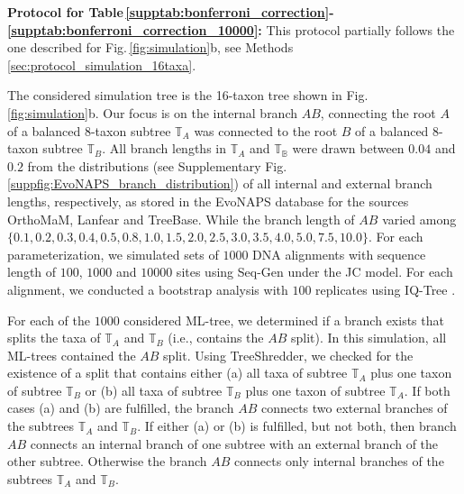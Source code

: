 \begin{appendices}
\noindent\textbf{Protocol for Table\,\ref{supptab:bonferroni_correction}-\,\ref{supptab:bonferroni_correction_10000}:} This protocol partially follows the one described for Fig.\,\ref{fig:simulation}b, see Methods \ref{sec:protocol_simulation_16taxa}.

\medskip

The considered simulation tree is the 16-taxon tree shown in Fig.\,\ref{fig:simulation}b. Our focus is on the internal branch $AB$, connecting the root $A$ of a balanced $8$-taxon subtree $\mathbb{T}_A$ was connected to the root $B$ of a balanced $8$-taxon subtree $\mathbb{T}_B$. All branch lengths in $\mathbb{T}_A$ and $\mathbb{T_B}$ were drawn between $0.04$ and $0.2$ from the distributions (see Supplementary Fig.\,\ref{suppfig:EvoNAPS_branch_distribution}) of all internal and external branch lengths, respectively, as stored in the EvoNAPS database  for the sources OrthoMaM, Lanfear and TreeBase. While the branch length of $AB$ varied among $\{0.1, 0.2, 0.3, 0.4, 0.5, 0.8, 1.0, 1.5, 2.0, 2.5, 3.0, 3.5, 4.0, 5.0, 7.5, 10.0\}$. For each parameterization, we simulated sets of $1000$ DNA alignments with sequence length of $100$, $1000$ and $10000$ sites using Seq-Gen  under the JC model. For each alignment, we conducted a bootstrap analysis with $100$ replicates using IQ-Tree . 

For each of the $1000$ considered ML-tree, we determined if a branch exists that splits the taxa of $\mathbb{T}_A$ and $\mathbb{T}_B$ (i.e.,  contains the $AB$ split). In this simulation, all ML-trees contained the $AB$ split. {\color{olive}Using  TreeShredder}, we checked for the existence of a split that contains either (a) all taxa of subtree $\mathbb{T}_A$ plus one taxon of subtree $\mathbb{T}_B$ or (b) all taxa of subtree $\mathbb{T}_B$ plus one taxon of subtree $\mathbb{T}_A$. If both cases (a) and (b) are fulfilled, the branch $AB$ connects two external branches of the subtrees $\mathbb{T}_A$ and $\mathbb{T}_B$. If  either (a) or (b) is fulfilled, but not both, then  branch $AB$ connects an internal branch of one subtree with an external branch of the other subtree. Otherwise the branch $AB$ connects only internal branches of the subtrees $\mathbb{T}_A$ and $\mathbb{T}_B$.
\clearpage
    

\end{appendices}
